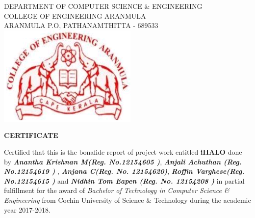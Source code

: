 \begin{titlepage}
  \begin{center}
    \vspace*{-2.0cm}
    
    \large
    \MakeUppercase{Department of Computer Science \& Engineering} \\
    \MakeUppercase{College of Engineering Aranmula} \\
    \MakeUppercase{Aranmula P.O, Pathanamthitta - 689533} \\
    
    \vspace{1.0cm}
    \includegraphics[scale=0.8]{./images/logo}

    \Large
    \textbf{\MakeUppercase{Certificate}}
  \end{center}

  \normalsize
  \noindent Certified that this is the bonafide report of project work entitled \textbf{iHALO} done by \textit{\bf Anantha Krishnan M(Reg. No.12154605 )}, \textit{\bf Anjali Achuthan (Reg. No.12154619 )} , \textit{\bf Anjana C(Reg. No. 12154620)}, \textit{\bf Roffin Varghese(Reg. No.12154615 )} and \textit{\bf Nidhin Tom Eapen  (Reg. No. 12154208 )} in partial fulfillment for the award of \textit{Bachelor of Technology in Computer Science \& Engineering} from Cochin University of Science \& Technology during the academic year 2017-2018.

 \vspace{2cm}


\end{titlepage}
